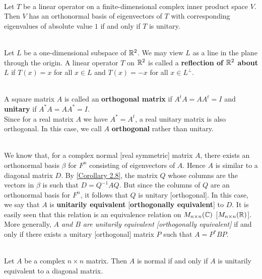 \begin{corollary}
	\hfill\\
	Let $T$ be a linear operator on a finite-dimensional complex inner product space $V$. Then $V$ has an orthonormal basis of eigenvectors of $T$ with corresponding eigenvalues of absolute value $1$ if and only if $T$ is unitary.
\end{corollary}

\begin{definition}
	\hfill\\
	Let $L$ be a one-dimensional subspace of $\mathbb{R}^2$. We may view $L$ as a line in the plane through the origin. A linear operator $T$ on $\mathbb{R}^2$ is called a \textbf{reflection of $\mathbb{R}^2$ about $L$} if $T(x) = x$ for all $x \in L$ and $T(x) = -x$ for all $x \in L^\perp$.
\end{definition}

\begin{definition}
	\hfill\\
	A square matrix $A$ is called an \textbf{orthogonal matrix} if $A^tA = AA^t = I$ and \textbf{unitary} if $A^*A = AA^* = I$.\\

	Since for a real matrix $A$ we have $A^* = A^t$, a real unitary matrix is also orthogonal. In this case, we call $A$ \textbf{orthogonal} rather than unitary.
\end{definition}

\begin{definition}
	\hfill\\
	We know that, for a complex normal [real symmetric] matrix $A$, there exists an orthonormal basis $\beta$ for $F^n$ consisting of eigenvectors of $A$. Hence $A$ is similar to a diagonal matrix $D$. By \autoref{Corollary 2.8}, the matrix $Q$ whose columns are the vectors in $\beta$ is such that $D = Q^{-1}AQ$. But since the columns of $Q$ are an orthonormal basis for $F^n$, it follows that $Q$ is unitary [orthogonal]. In this case, we say that $A$ is \textbf{unitarily equivalent} [\textbf{orthogonally equivalent}] to $D$. It is easily seen that this relation is an equivalence relation on $M_{n \times n}(\mathbb{C})$ [$M_{n \times n}(\mathbb{R})$]. More generally, \textit{$A$ and $B$ are unitarily equivalent [orthogonally equivalent]} if and only if there exists a unitary [orthogonal] matrix $P$ such that $A = P^*BP$.
\end{definition}

\begin{theorem}
	\hfill\\
	Let $A$ be a complex $n \times n$ matrix. Then $A$ is normal if and only if $A$ is unitarily equivalent to a diagonal matrix.
\end{theorem}

